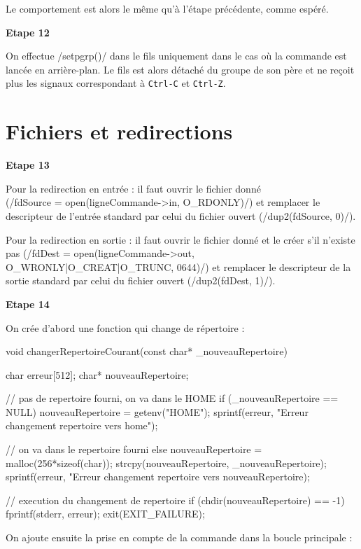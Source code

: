 \documentclass[a4paper, 12pt]{article}
\begin{document}
Le comportement est alors le même qu'à l'étape précédente, comme espéré.

\newpage
\noindent
\textbf{Etape 12}

On effectue \cinline/setpgrp()/ dans le fils uniquement dans le cas où la commande est lancée en arrière-plan. Le fils est alors détaché du groupe de son père et ne reçoit plus les signaux correspondant à \texttt{Ctrl-C} et \texttt{Ctrl-Z}.

\part{Fichiers et redirections}

\bigskip
\noindent
\textbf{Etape 13}

\bigskip
Pour la redirection en entrée : il faut ouvrir le fichier donné\\
\noindent(\cinline/fdSource = open(ligneCommande->in, O_RDONLY)/) et remplacer le descripteur de l'entrée standard par celui du fichier ouvert (\cinline/dup2(fdSource, 0)/).

Pour la redirection en sortie : il faut ouvrir le fichier donné et le créer s'il n'existe pas (\cinline/fdDest = open(ligneCommande->out, O_WRONLY|O_CREAT|O_TRUNC, 0644)/) et remplacer le descripteur de la sortie standard par celui du fichier ouvert (\cinline/dup2(fdDest, 1)/).

\bigskip
\noindent
\textbf{Etape 14}

\bigskip
On crée d'abord une fonction qui change de répertoire :

\begin{ccode}
void changerRepertoireCourant(const char* _nouveauRepertoire) {
	char erreur[512];
	char* nouveauRepertoire;

	// pas de repertoire fourni, on va dans le HOME
	if (_nouveauRepertoire == NULL) {
		nouveauRepertoire = getenv("HOME");
		sprintf(erreur, "Erreur changement repertoire vers home\n");
	}

	// on va dans le repertoire fourni
	else {
		nouveauRepertoire = malloc(256*sizeof(char));
		strcpy(nouveauRepertoire, _nouveauRepertoire);
		sprintf(erreur, "Erreur changement repertoire vers %
							nouveauRepertoire);
	}

	// execution du changement de repertoire
	if (chdir(nouveauRepertoire) == -1) {
		fprintf(stderr, erreur);
		exit(EXIT_FAILURE);
	}
}
\end{ccode}

\newpage
On ajoute ensuite la prise en compte de la commande dans la boucle principale :
\end{document}
